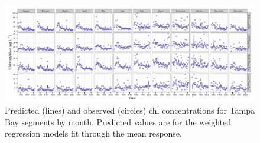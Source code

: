 \documentclass{svjour3}\usepackage[]{graphicx}\usepackage[]{color}
\newcommand{\beginsupplement}{%
        \setcounter{table}{0}
        \renewcommand{\thetable}{S\arabic{table}}%
        \setcounter{figure}{0}
        \renewcommand{\thefigure}{S\arabic{figure}}%
     }
\begin{document}
\beginsupplement
\begin{landscape}
\centering\vspace*{\fill}
\begin{figure}[!ht]


{\centering \includegraphics[width=9in]{figssup} 

}

\caption[Predicted (lines) and observed (circles) \ac{chl} concentrations for Tampa Bay segments by month]{Predicted (lines) and observed (circles) \ac{chl} concentrations for Tampa Bay segments by month.  Predicted values are for the weighted regression models fit through the mean response.\label{fig:sup}}
\end{figure}


\vfill
\end{landscape}
\end{document}
